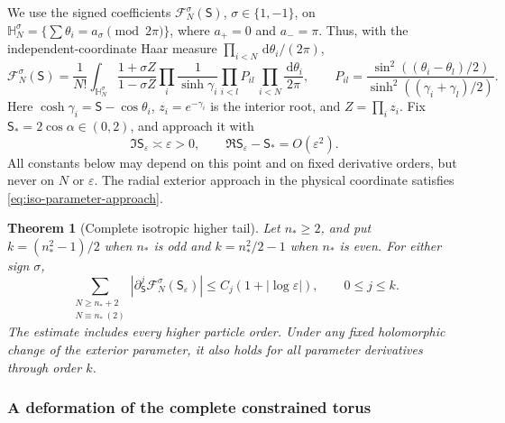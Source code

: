 \documentclass[11pt]{article}
\numberwithin{equation}{section}
\newtheorem{theorem}{Theorem}[section]
\theoremstyle{definition}
\newcommand{\dd}{\,\mathrm d}
\newcommand{\eps}{\varepsilon}
\begin{document}
We use the signed coefficients $\mathcal F_N^\sigma(\mathsf S)$,
$\sigma\in\{1,-1\}$, on
$\mathbb H_N^\sigma=\{\sum\theta_i=a_\sigma\pmod {2\pi}\}$,
where $a_+=0$ and $a_-=\pi$.  Thus, with the independent-coordinate
Haar measure $\prod_{i<N}\dd\theta_i/(2\pi)$,
\begin{equation}\label{eq:iso-tail-coefficient}
 \mathcal F_N^\sigma(\mathsf S)=\frac1{N!}
 \int_{\mathbb H_N^\sigma}
 \frac{1+\sigma Z}{1-\sigma Z}
 \prod_i\frac1{\sinh\gamma_i}\prod_{i<l}P_{il}\,
 \prod_{i<N}\frac{\dd\theta_i}{2\pi},\qquad
 P_{il}=\frac{\sin^2((\theta_i-\theta_l)/2)}
                {\sinh^2((\gamma_i+\gamma_l)/2)}.
\end{equation}
Here $\cosh\gamma_i=\mathsf S-\cos\theta_i$, $z_i=e^{-\gamma_i}$
is the interior root, and $Z=\prod_i z_i$.
Fix $\mathsf S_*=2\cos\alpha\in(0,2)$, and approach it with
\begin{equation}\label{eq:iso-parameter-approach}
 \Im\mathsf S_\eps\asymp\eps>0,
 \qquad \Re\mathsf S_\eps-\mathsf S_*=O(\eps^2).
\end{equation}
All constants below may depend on this point and on fixed derivative
orders, but never on $N$ or $\eps$.  The radial exterior approach in
the physical coordinate satisfies \eqref{eq:iso-parameter-approach}.

\begin{theorem}[Complete isotropic higher tail]\label{thm:iso-tail}
Let $n_*\ge2$, and put $k=(n_*^2-1)/2$ when $n_*$ is odd and
$k=n_*^2/2-1$ when $n_*$ is even.  For either sign $\sigma$,
\begin{equation}\label{eq:iso-complete-tail}
 \sum_{\substack{N\ge n_*+2\\N\equiv n_*\ (2)}}
  |\partial_{\mathsf S}^j\mathcal F_N^\sigma(\mathsf S_\eps)|
 \le C_j(1+|\log\eps|),\qquad 0\le j\le k.
\end{equation}
The estimate includes every higher particle order.  Under any fixed
holomorphic change of the exterior parameter, it also holds for all
parameter derivatives through order $k$.
\end{theorem}

\subsubsection{A deformation of the complete constrained torus}
\end{document}
